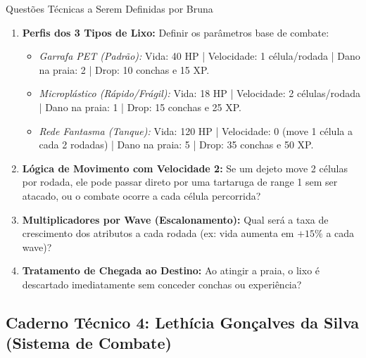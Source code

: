 \documentclass[11pt,a4paper]{article}
\begin{document}
\begin{perguntaBox}{Questões Técnicas a Serem Definidas por Bruna}
\begin{enumerate}
  \item \textbf{Perfis dos 3 Tipos de Lixo:} Definir os parâmetros base de combate:
  \begin{itemize}
    \item \textit{Garrafa PET (Padrão):} Vida: 40 HP | Velocidade: 1 célula/rodada | Dano na praia: 2 | Drop: 10 conchas e 15 XP.
    \item \textit{Microplástico (Rápido/Frágil):} Vida: 18 HP | Velocidade: 2 células/rodada | Dano na praia: 1 | Drop: 15 conchas e 25 XP.
    \item \textit{Rede Fantasma (Tanque):} Vida: 120 HP | Velocidade: 0 (move 1 célula a cada 2 rodadas) | Dano na praia: 5 | Drop: 35 conchas e 50 XP.
  \end{itemize}
  \item \textbf{Lógica de Movimento com Velocidade 2:} Se um dejeto move 2 células por rodada, ele pode passar direto por uma tartaruga de range 1 sem ser atacado, ou o combate ocorre a cada célula percorrida?
  \item \textbf{Multiplicadores por Wave (Escalonamento):} Qual será a taxa de crescimento dos atributos a cada rodada (ex: vida aumenta em $+15\%$ a cada wave)?
  \item \textbf{Tratamento de Chegada ao Destino:} Ao atingir a praia, o lixo é descartado imediatamente sem conceder conchas ou experiência?
\end{enumerate}
\end{perguntaBox}

\subsection{Caderno Técnico 4: Lethícia Gonçalves da Silva (Sistema de Combate)}
\end{document}
